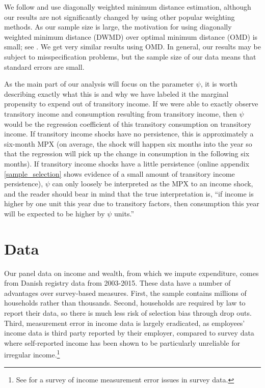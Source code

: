 \documentclass[titlepage]{\econtex}\newcommand{\texname}{ConsumptionHeterogeneity}
\begin{document}
	We follow \cite{blundell_consumption_2008} and use diagonally weighted minimum distance estimation, although our results are not significantly changed by using other popular weighting methods. As our sample size is large, the motivation for using diagonally weighted minimum distance (DWMD) over optimal minimum distance (OMD) is small; see \cite{altonji_small-sample_1996}. We get very similar results using OMD. In general, our results may be subject to misspecification problems, but the sample size of our data means that standard errors are small.
	
	As the main part of our analysis will focus on the parameter $\psi$, it is worth describing exactly what this is and why we have labeled it the marginal propensity to expend out of transitory income. If we were able to exactly observe transitory income and consumption resulting from transitory income, then $\psi$ would be the regression coefficient of this transitory consumption on transitory income. If transitory income shocks have no persistence, this is approximately a six-month MPX (on average, the shock will happen six months into the year so that the regression will pick up the change in consumption in the following six months). If transitory income shocks have a little persistence (online appendix \ref{sample_selection} shows evidence of a small amount of transitory income persistence), $\psi$ can only loosely be interpreted as the MPX to an income shock, and the reader should bear in mind that the true interpretation is, ``if income is higher by one unit this year due to transitory factors, then consumption this year will be expected to be higher by $\psi$ units.''
	

	
	\section{Data}
	Our panel data on income and wealth, from which we impute expenditure, comes from Danish registry data from 2003-2015. These data have a number of advantages over survey-based measures. First, the sample contains millions of households rather than thousands. Second, households are required by law to report their data, so there is much less risk of selection bias through drop outs. Third, measurement error in income data is largely eradicated, as employees' income data is third party reported by their employer, compared to survey data where self-reported income has been shown to be particularly unreliable for irregular income.\footnote{See \cite{david_income_nodate} for a survey of income measurement error issues in survey data.}
	
\end{document}
